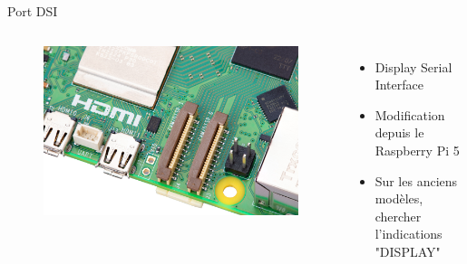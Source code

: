 \documentclass[aspectratio=169,xcolor=dvipsnames]{beamer}
\begin{document}
\begin{frame}{Port DSI}
    \begin{columns}[c] %

        \begin{figure}
            \includegraphics[width=1\textwidth]{images/rpi-5-dsi-csi.jpg}
        \end{figure}

        \begin{itemize}
            \item Display Serial Interface
            \item Modification depuis le Raspberry Pi 5
            \item Sur les anciens modèles, chercher l'indications "DISPLAY"
        \end{itemize}

    \end{columns}
\end{frame}
\end{document}
